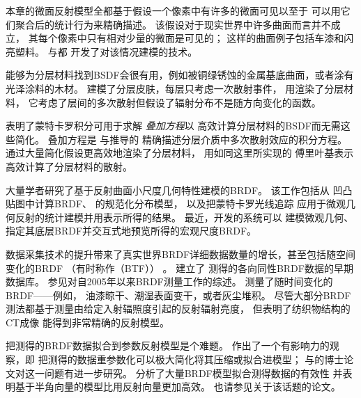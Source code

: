 本章的微面反射模型全都基于假设一个像素中有许多的微面可见以至于
可以用它们聚合后的统计行为来精确描述。
该假设对于现实世界中许多曲面而言并不成立，
其每个像素中只有相对少量的微面是可见的；
这样的曲面例子包括车漆和闪亮塑料。
\citet{10.1145/2601097.2601155}与\citet{10.1145/2601097.2601186}都
开发了对该情况建模的技术。

能够为分层材料找到BSDF会很有用，例如被铜绿锈蚀的金属基底曲面，或者涂有光泽涂料的木材。
\citet{10.1145/166117.166139}建模了分层皮肤，每层只考虑一次散射事件，
\citet{10.1145/237170.237278}用渲染了分层材料，
它考虑了层间的多次散射但假设了辐射分布不是随方向变化的函数。

\citet{10.1145/344779.344824}表明了蒙特卡罗积分可用于求解
\emph{叠加方程}以
高效计算分层材料的BSDF而无需这些简化。
叠加方程是\citet{10.1016/B978-0-12-710701-1.50002-1}
与\citet{MatrixMethodsforMultipleScatteringProblems}推导的
精确描述分层介质中多次散射效应的积分方程。
\citet{10.1145/1321261.1321292}通过大量简化假设更高效地渲染了分层材料，
\citet{10.1145/2601097.2601139}用如同这里所实现的
傅里叶基表示高效计算了分层材料的散射。

大量学者研究了基于反射曲面小尺度几何特性建模的BRDF。
该工作包括\citet{10.1145/37401.37434}从
凹凸贴图中计算BRDF、
\citet{fournier1992normal}的规范化分布模型，
以及\citet{10.1145/133994.134075}把蒙特卡罗光线追踪
应用于微观几何反射的统计建模并用表示所得的结果。
最近，\citet{10.1145/2070781.2024179}开发的系统可以
建模微观几何、指定其底层BRDF并交互式地预览所得的宏观尺度BRDF。

数据采集技术的提升带来了真实世界BRDF详细数据数量的增长，甚至包括随空间变化的BRDF
（有时称作（BTF））
\citep{10.1145/300776.300778}。
\citet{10.5555/882404.882439,10.1145/882262.882343}建立了
测得的各向同性BRDF数据的早期数据库。
参见\citet{10.1111/j.1467-8659.2005.00830.x}对自2005年以来BRDF测量工作的综述。
\citet{10720740}测量了随时间变化的BRDF——例如，
油漆晾干、潮湿表面变干，或者灰尘堆积。
尽管大部分BRDF测法都基于测量由给定入射辐照度引起的反射辐射亮度，
但\citet{10.1145/2010324.1964939}表明了纺织物结构的CT成像
能得到非常精确的反射模型。

把测得的BRDF数据拟合到参数反射模型是个难题。
\citet{10.1007/978-3-7091-6453-2_2}作出了一个有影响力的观察，即
把测得的数据重参数化可以极大简化将其压缩或拟合进模型；
\citet{1388224}与\citet{Marschner1998}的博士论文对这一问题有进一步研究。
\citet{ngan:brdfanalysis:egsr2005}分析了大量BRDF模型拟合测得数据的有效性
并表明基于半角向量的模型比用反射向量更加高效。
也请参见\citet{10.1145/1122501.1122502}关于该话题的论文。


